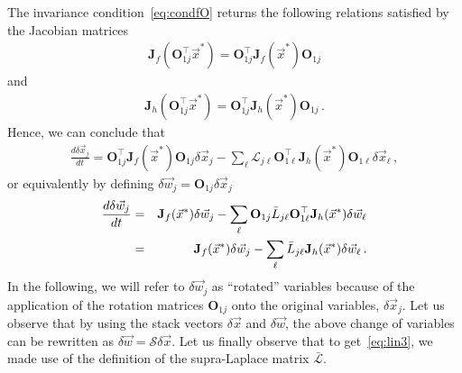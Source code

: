 \documentclass[aps,showpacs,preprintnumbers,amsmath,amssymb,twocolumn,superscriptaddress,floatfix,nofootinbib,10pt,pre]{revtex4-1}
\begin{document}
The invariance condition~\eqref{eq:condfO} returns the following relations satisfied by the Jacobian matrices
\begin{align}
 \mathbf{J}_{f}(\mathbf{O}_{1j}^\top\vec{x}^*)=\mathbf{O}_{1j}^\top\mathbf{J}_{f}(\vec{x}^*)\mathbf{O}_{1j}
\end{align}
and
\begin{align}\mathbf{J}_{h}(\mathbf{O}_{1j}^\top\vec{x}^*)=\mathbf{O}_{1j}^\top\mathbf{J}_{h}(\vec{x}^*)\mathbf{O}_{1j}\, .
\end{align}
Hence, we can conclude that
\begin{align}
\frac{d\delta \vec{x}_j}{dt}
 =\mathbf{O}_{1j}^\top\mathbf{J}_{f}(\vec{x}^*)\mathbf{O}_{1j}
 \delta \vec{x}_j-\sum_\ell \mathcal{L}_{j\ell}\mathbf{O}_{1\ell}^\top\mathbf{J}_{h}(\vec{x}^*)
 \mathbf{O}_{1\ell}\delta \vec{x}_\ell\, ,
\end{align}
or equivalently by defining $\delta\vec{w}_j=\mathbf{O}_{1j}\delta\vec{x}_j$
\begin{eqnarray}
\label{eq:lin3}
\frac{d\delta \vec{w}_j}{dt}
 &=&\mathbf{J}_{f}(\vec{x}^*)
 \delta \vec{w}_j-\sum_\ell \mathbf{O}_{1j}\bar{L}_{j\ell}\mathbf{O}_{1\ell}^\top\mathbf{J}_{h}(\vec{x}^*)
 \delta \vec{w}_\ell\notag\\
 &=&\mathbf{J}_{f}(\vec{x}^*)
 \delta \vec{w}_j-\sum_\ell \bar{{L}}_{j\ell}\mathbf{J}_{h}(\vec{x}^*)
 \delta \vec{w}_\ell\, .
\end{eqnarray}
In the following, we will refer to $\delta\vec{w}_j$ as ``rotated'' variables because of the application of the rotation matrices $\mathbf{O}_{1j}$ onto the original variables, $\delta\vec{x}_j$. Let us observe that by using the stack vectors $\delta\vec{x}$ and $\delta\vec{w}$, the above change of variables can be rewritten as $\delta\vec{w}=\mathcal{S}\delta\vec{x}$. Let us finally observe that to get~\eqref{eq:lin3}, we made use of the definition of the supra-Laplace matrix $\bar{\mathcal{L}}$. 
\end{document}
